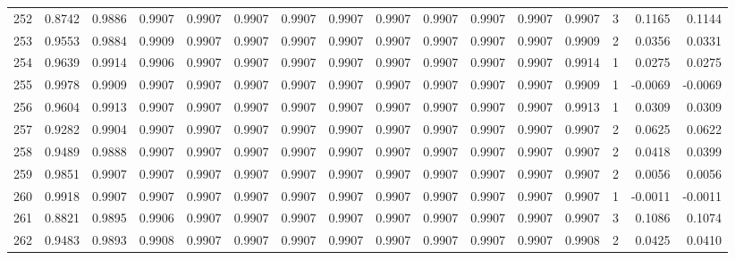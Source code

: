 \begin{tabular}{lrrrrrrrrrrrrrrr}
252 &      0.8742 &  0.9886 &  0.9907 &  0.9907 &  0.9907 &  0.9907 &  0.9907 &  0.9907 &  0.9907 &  0.9907 &   0.9907 &     0.9907 &      3 &                    0.1165 &                     0.1144 \\
253 &      0.9553 &  0.9884 &  0.9909 &  0.9907 &  0.9907 &  0.9907 &  0.9907 &  0.9907 &  0.9907 &  0.9907 &   0.9907 &     0.9909 &      2 &                    0.0356 &                     0.0331 \\
254 &      0.9639 &  0.9914 &  0.9906 &  0.9907 &  0.9907 &  0.9907 &  0.9907 &  0.9907 &  0.9907 &  0.9907 &   0.9907 &     0.9914 &      1 &                    0.0275 &                     0.0275 \\
255 &      0.9978 &  0.9909 &  0.9907 &  0.9907 &  0.9907 &  0.9907 &  0.9907 &  0.9907 &  0.9907 &  0.9907 &   0.9907 &     0.9909 &      1 &                   -0.0069 &                    -0.0069 \\
256 &      0.9604 &  0.9913 &  0.9907 &  0.9907 &  0.9907 &  0.9907 &  0.9907 &  0.9907 &  0.9907 &  0.9907 &   0.9907 &     0.9913 &      1 &                    0.0309 &                     0.0309 \\
257 &      0.9282 &  0.9904 &  0.9907 &  0.9907 &  0.9907 &  0.9907 &  0.9907 &  0.9907 &  0.9907 &  0.9907 &   0.9907 &     0.9907 &      2 &                    0.0625 &                     0.0622 \\
258 &      0.9489 &  0.9888 &  0.9907 &  0.9907 &  0.9907 &  0.9907 &  0.9907 &  0.9907 &  0.9907 &  0.9907 &   0.9907 &     0.9907 &      2 &                    0.0418 &                     0.0399 \\
259 &      0.9851 &  0.9907 &  0.9907 &  0.9907 &  0.9907 &  0.9907 &  0.9907 &  0.9907 &  0.9907 &  0.9907 &   0.9907 &     0.9907 &      2 &                    0.0056 &                     0.0056 \\
260 &      0.9918 &  0.9907 &  0.9907 &  0.9907 &  0.9907 &  0.9907 &  0.9907 &  0.9907 &  0.9907 &  0.9907 &   0.9907 &     0.9907 &      1 &                   -0.0011 &                    -0.0011 \\
261 &      0.8821 &  0.9895 &  0.9906 &  0.9907 &  0.9907 &  0.9907 &  0.9907 &  0.9907 &  0.9907 &  0.9907 &   0.9907 &     0.9907 &      3 &                    0.1086 &                     0.1074 \\
262 &      0.9483 &  0.9893 &  0.9908 &  0.9907 &  0.9907 &  0.9907 &  0.9907 &  0.9907 &  0.9907 &  0.9907 &   0.9907 &     0.9908 &      2 &                    0.0425 &                     0.0410 \\

\end{tabular}
